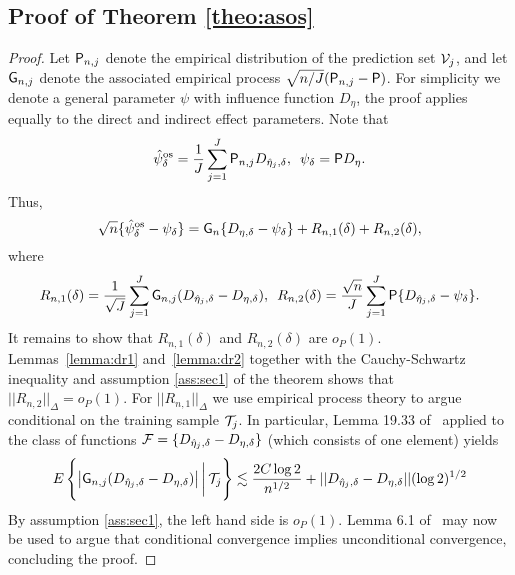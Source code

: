 \subsection{Proof of Theorem \ref{theo:asos}}
\begin{proof}
  Let $\mathsf{P}_{n,j}$ denote
  the empirical distribution of the prediction set ${\cal V}_j$, and let
  $\mathsf{G}_{n,j}$ denote the associated empirical process
  $\sqrt{n/J}(\mathsf{P}_{n,j}-\mathsf{P})$. For simplicity we denote a general parameter
  $\psi$ with influence function $D_\eta$, the proof applies equally
  to the direct and indirect effect parameters. Note that
  \[\hat\psi^{\mbox{\scriptsize os}}_\delta = \frac{1}{J}\sum_{j=1}^J\mathsf{P}_{n,j} D_{\hat
      \eta_j,\delta},\,\,\,\psi_\delta=\mathsf{P} D_{\eta}.\]Thus,
  \[  \sqrt{n}\{\hat\psi^{\mbox{\scriptsize os}}_\delta - \psi_\delta\}=\mathsf{G}_{n} \{D_{\eta,\delta}
    - \psi_\delta\} + R_{n,1}(\delta) + R_{n,2}(\delta),\]
  where
  \[  R_{n,1}(\delta)  =\frac{1}{\sqrt{J}}\sum_{j=1}^J\mathsf{G}_{n,j}(D_{\hat
      \eta_j,\delta} - D_{\eta,\delta}),\,\,\,
    R_{n,2}(\delta)  = \frac{\sqrt{n}}{J}\sum_{j=1}^J\mathsf{P}\{D_{\hat
      \eta_j,\delta}-\psi_\delta\}.
  \]
  It remains to show that $R_{n,1}(\delta)$ and $R_{n,2}(\delta)$ are
  $o_P(1)$. Lemmas~\ref{lemma:dr1} and~\ref{lemma:dr2} together
  with the Cauchy-Schwartz inequality and assumption \ref{ass:sec1}
  of the theorem shows that $||R_{n,2}||_{\Delta}=o_P(1)$. For
  $||R_{n,1}||_{\Delta}$ we use empirical process theory to argue conditional
  on the training sample ${\cal T}_j$. In particular, Lemma 19.33
  of~\cite{vdvaart2000asymptotic} applied to the class of functions
  ${\cal F} = \{D_{\hat \eta_j,\delta} - D_{\eta,\delta}\}$ (which
  consists of one element) yields
  \[E\left\{\big|\mathsf{G}_{n,j} (D_{\hat \eta_j,\delta} - D_{\eta,\delta})\big|
      \,\bigg|\, {\cal T}_j\right\}\lesssim \frac{2C\log 2}{n^{1/2}} +
    ||D_{\hat \eta_j,\delta} - D_{\eta,\delta}||(\log 2)^{1/2}\] By
  assumption \ref{ass:sec1}, the left hand side is $o_P(1)$. Lemma 6.1
  of~\cite{chernozhukov2018double} may now be used to argue that
  conditional convergence implies unconditional convergence, concluding
  the proof.
\end{proof}

